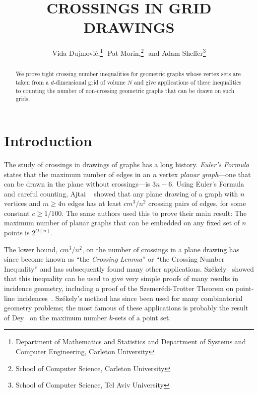 \documentclass{patmorin}
\title{\MakeUppercase{Crossings in Grid Drawings}}
\author{%
  Vida Dujmovi\'c,\thanks{Department of Mathematics and Statistics
       and Department of Systems and Computer Engineering, 
       Carleton University}\,\, 
  Pat Morin,\thanks{School of Computer Science, Carleton University}\,\, and 
  Adam Sheffer\thanks{School of Computer Science, Tel Aviv University}}
\newcommand{\n}{N}
\begin{document}
\begin{titlepage}
\maketitle

\begin{abstract}
   We prove tight crossing number inequalities for geometric graphs whose
   vertex sets are taken from a $d$-dimensional grid of volume $\n$
   and give applications of these inequalities to counting the number
   of non-crossing geometric graphs that can be drawn on such grids.
\end{abstract}

\end{titlepage}


\section{Introduction}

The study of crossings in drawings of graphs has a long history.
\emph{Euler's Formula} states that the maximum number of edges in an $n$
vertex \emph{planar graph}---one that can be drawn in the plane without
crossings---is $3n-6$.  Using Euler's Formula and careful counting, Ajtai
\etal~\cite{ajtai.chvatal.ea:crossing-free} showed that any plane drawing
of a graph with $n$ vertices and $m\ge 4n$ edges has at least $c m^3/n^2$
crossing pairs of edges, for some constant $c\ge 1/100$.  The same authors
used this to prove their main result: The maximum number of planar graphs
that can be embedded on any fixed set of $n$ points is $2^{O(n)}$.

The lower bound, $cm^3/n^2$, on the number of crossings in a plane
drawing has since become known as ``the \emph{Crossing Lemma}''
or ``the Crossing Number Inequality'' and has subsequently found many
other applications.  Sz\'ekely~\cite{szekely:crossing} showed that
this inequality can be used to give very simple proofs of many results
in incidence geometry, including a proof of the Szemer\'edi-Trotter
Theorem on point-line incidences~\cite{szemeredi.trotter:extremal}.
Sz\'ekely's method has since been used for many combinatorial geometry
problems; the most famous of these applications is probably the result
of Dey~\cite{dey:improved} on the maximum number $k$-sets of a point set.
\end{document}

